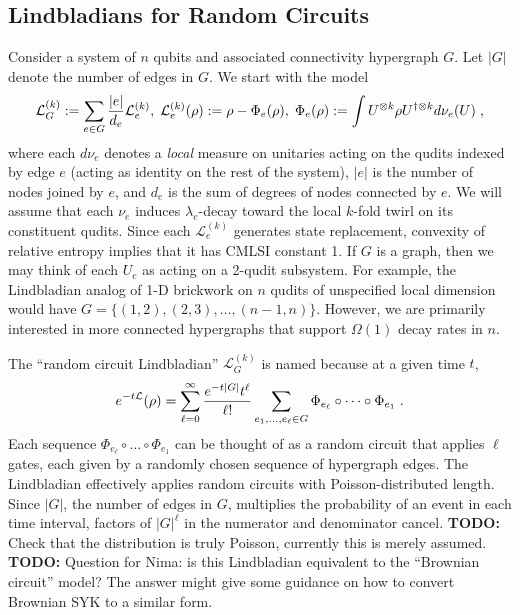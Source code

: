 \documentclass[11pt,reqno]{amsart}
\newcommand{\pl}{\hspace{.1cm}}
\renewcommand{\L}{\mathcal{L}}
\newcommand{\todo}[1]{{\color{red}\textbf{TODO:} #1}}
\begin{document}
\subsection{Lindbladians for Random Circuits}
Consider a system of $n$ qubits and associated connectivity hypergraph $G$. Let $|G|$ denote the number of edges in $G$. We start with the model
\begin{equation} \label{eq:circuit-hypergraph-lind}
    \L^{(k)}_G := \sum_{e \in G} \frac{|e|}{d_e} \L_e^{(k)},
    \pl \L_e^{(k)}(\rho) := \rho - \Phi_e(\rho) ,
    \pl \Phi_e(\rho) := \int U^{\otimes k} \rho U^{\dagger \otimes k} d \nu_e(U) \pl,
\end{equation}
where each $d \nu_e$ denotes a \textit{local} measure on unitaries acting on the qudits indexed by edge $e$ (acting as identity on the rest of the system), $|e|$ is the number of nodes joined by $e$, and $d_e$ is the sum of degrees of nodes connected by $e$. We will assume that each $\nu_e$ induces $\lambda_e$-decay toward the local $k$-fold twirl on its constituent qudits. Since each $\L_e^{(k)}$ generates state replacement, convexity of relative entropy implies that it has CMLSI constant 1. If $G$ is a graph, then we may think of each $U_e$ as acting on a 2-qudit subsystem. For example, the Lindbladian analog of 1-D brickwork on $n$ qudits of unspecified local dimension would have $G = \{(1,2), (2,3), \dots, (n-1, n)\}$. However, we are primarily interested in more connected hypergraphs that support $\Omega(1)$ decay rates in $n$.

The ``random circuit Lindbladian'' $\L^{(k)}_G$ is named because at a given time $t$,
\begin{equation}
    e^{- t \L}(\rho) = \sum_{\ell=0}^\infty \frac{e^{-t|G|} t^{\ell}}{\ell!} \sum_{e_1, \dots, e_\ell \in G} \Phi_{e_\ell} \circ \dots \circ \Phi_{e_1} \pl.
\end{equation}
Each sequence $\Phi_{e_\ell} \circ \dots \circ \Phi_{e_1}$ can be thought of as a random circuit that applies $\ell$ gates, each given by a randomly chosen sequence of hypergraph edges. The Lindbladian effectively applies random circuits with Poisson-distributed length. Since $|G|$, the number of edges in $G$, multiplies the probability of an event in each time interval, factors of $|G|^{\ell}$ in the numerator and denominator cancel. \todo{Check that the distribution is truly Poisson, currently this is merely assumed.} \todo{Question for Nima: is this Lindbladian equivalent to the ``Brownian circuit'' model? The answer might give some guidance on how to convert Brownian SYK to a similar form.}
\end{document}
